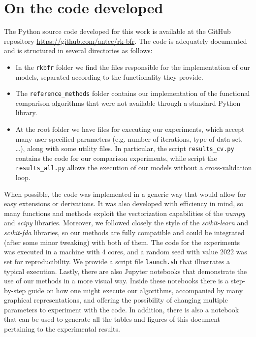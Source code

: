 %
%

\chapter{On the code developed}\label{ch:code}

The Python source code developed for this work is available at the GitHub repository \url{https://github.com/antcc/rk-bfr}. The code is adequately documented and is structured in several directories as follows:

\begin{itemize}
  \item In the \texttt{rkbfr} folder we find the files responsible for the implementation of our models, separated according to the functionality they provide.
  \item The \texttt{reference\_methods} folder contains our implementation of the functional comparison algorithms that were not available through a standard Python library.
  \item At the root folder we have files for executing our experiments, which accept many user-specified parameters (e.g. number of iterations, type of data set, \ldots), along with some utility files. In particular, the script \texttt{results\_cv.py} contains the code for our comparison experiments, while script the \texttt{results\_all.py} allows the execution of our models without a cross-validation loop.
\end{itemize}

When possible, the code was implemented in a generic way that would allow for easy extensions or derivations. It was also developed with efficiency in mind, so many functions and methods exploit the vectorization capabilities of the \textit{numpy} and \textit{scipy} libraries. Moreover, we followed closely the style of the \textit{scikit-learn} and \textit{scikit-fda} libraries, so our methods are fully compatible and could be integrated (after some minor tweaking) with both of them. The code for the experiments was executed in a machine with 4 cores, and a random seed with value 2022 was set for reproducibility. We provide a script file \texttt{launch.sh} that illustrates a typical execution. Lastly, there are also Jupyter notebooks that demonstrate the use of our methods in a more visual way. Inside these notebooks there is a step-by-step guide on how one might execute our algorithms, accompanied by many graphical representations, and offering the possibility of changing multiple parameters to experiment with the code. In addition, there is also a notebook that can be used to generate all the tables and figures of this document pertaining to the experimental results.
